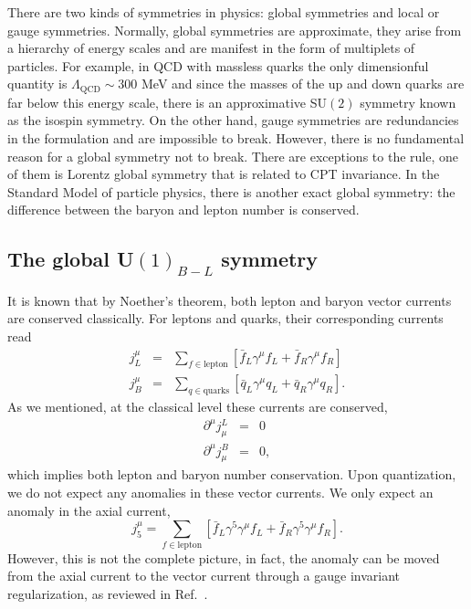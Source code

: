 There are two kinds of symmetries in physics: global symmetries and local or gauge symmetries. Normally, global symmetries are approximate, they arise from a hierarchy of energy scales and are manifest in the form of multiplets of particles. For example, in QCD with massless quarks the only dimensionful quantity is $\Lambda_{\text{QCD}}\sim 300$ MeV and since the masses of the up and down quarks are far below this energy scale, there is an approximative SU$(2)$ symmetry known as the isospin  symmetry. On the other hand, gauge symmetries are redundancies in the formulation and are impossible to break. However, there is no fundamental reason for a global symmetry not to break. There are exceptions to the rule, one of them is Lorentz global symmetry that is related to CPT invariance. 
In the Standard Model of  particle physics, there is another exact global symmetry: the difference between the baryon and lepton number is conserved. 

\subsection{The global U$(1)_{B-L}$ symmetry}\label{sec:globalU} 
It is known that by Noether's theorem, both lepton and baryon vector currents are conserved classically. For leptons and quarks, their corresponding currents read
\begin{eqnarray}
	j_L^{\mu} & = & \sum_{f\in\text{lepton}} \left[\bar{f}_L \gamma^{\mu}f_L+\bar{f}_R \gamma^{\mu}f_R \right]\nonumber\\
	j_B^{\mu} & = & \sum_{q\in\text{quarks}} \left[\bar{q}_L \gamma^{\mu}q_L+\bar{q}_R \gamma^{\mu}q_R \right].
\end{eqnarray}
As we mentioned, at the classical level these currents are conserved,
\begin{eqnarray}
	\partial^{\mu}j_{\mu}^L & = & 0\nonumber\\
	\partial^{\mu}j_{\mu}^B & = & 0,
\end{eqnarray}
which implies both lepton and baryon number conservation. Upon quantiza\-tion, we do not expect any anomalies in these vector currents. We only expect an anomaly in the axial current,
\begin{equation}
	j^{\mu}_5  =  \sum_{f\in\text{lepton}} \left[\bar{f}_L \gamma^5\gamma^{\mu}f_L+\bar{f}_R \gamma^5\gamma^{\mu}f_R \right].
\end{equation}
However, this is not the complete picture, in fact, the anomaly can be moved from the axial current to the vector current through a gauge invariant regularization, as reviewed in Ref.\ \cite{10.1088/978-1-6817-4457-5}. 

